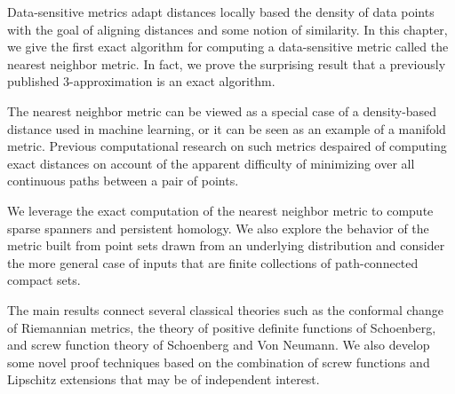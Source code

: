 
  Data-sensitive metrics adapt distances locally based the density of data points with the goal of aligning distances and some notion of similarity.
  In this chapter, we give the first exact algorithm for computing a data-sensitive metric called the nearest neighbor metric.
  In fact, we prove the surprising result that a previously published $3$-approximation is an exact algorithm.

  The nearest neighbor metric can be viewed as a special case of a density-based distance used in machine learning, or it can be seen as an example of a manifold metric.
  Previous computational research on such metrics despaired of computing exact distances on account of the apparent difficulty of minimizing over all continuous paths between a pair of points.

  We leverage the exact computation of the nearest neighbor metric to compute sparse spanners and persistent homology.
  We also explore the behavior of the metric built from point sets drawn
from an underlying distribution and consider the more general case of
inputs that are finite collections of path-connected compact sets.

  The main results connect several classical theories such as the conformal change of Riemannian metrics, the theory of positive definite functions of Schoenberg, and screw function theory of Schoenberg and Von Neumann.
  We also develop some novel proof techniques based on the combination of screw functions and Lipschitz extensions that may be of independent interest.

